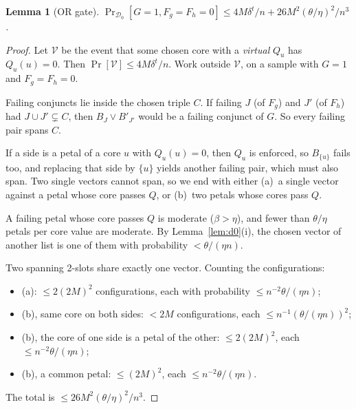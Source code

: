 \documentclass[11pt,a4paper]{article}
\theoremstyle{plain}
\newtheorem{lemma}[theorem]{Lemma}
\theoremstyle{definition}
\theoremstyle{remark}
\newcommand{\Dz}{\mathcal{D}_0}
\begin{document}
\begin{lemma}[OR gate]\label{lem:or}
$\Pr_{\Dz}[G=1,F_g=F_h=0]\le4M\delta^t/n+26M^2(\theta/\eta)^2/n^3$.
\end{lemma}
\begin{proof}
Let $\mathcal V$ be the event that some chosen core with a \emph{virtual} $Q_u$ has $Q_u(u)=0$. Then
$\Pr[\mathcal V]\le4M\delta^t/n$. Work outside $\mathcal V$, on a sample with $G=1$ and $F_g=F_h=0$.

Failing conjuncts lie inside the chosen triple $C$. If failing $J$ (of $F_g$) and $J'$ (of $F_h$) had
$J\cup J'\subsetneq C$, then $B_J\vee B'_{J'}$ would be a failing conjunct of $G$. So every failing pair spans $C$.

If a side is a petal of a core $u$ with $Q_u(u)=0$, then $Q_u$ is enforced, so $B_{\{u\}}$ fails too, and replacing
that side by $\{u\}$ yields another failing pair, which must also span. Two single vectors cannot span, so we end
with either (a)~a single vector against a petal whose core passes $Q$, or (b)~two petals whose cores pass $Q$.

A failing petal whose core passes $Q$ is moderate ($\beta>\eta$), and fewer than $\theta/\eta$ petals per core value
are moderate. By Lemma~\ref{lem:d0}(i), the chosen vector of another list is one of them with probability
$<\theta/(\eta n)$.

Two spanning 2-slots share exactly one vector. Counting the configurations:
\begin{itemize}
  \item (a): $\le2(2M)^2$ configurations, each with probability $\le n^{-2}\theta/(\eta n)$;
  \item (b), same core on both sides: $<2M$ configurations, each $\le n^{-1}(\theta/(\eta n))^2$;
  \item (b), the core of one side is a petal of the other: $\le2(2M)^2$, each $\le n^{-2}\theta/(\eta n)$;
  \item (b), a common petal: $\le(2M)^2$, each $\le n^{-2}\theta/(\eta n)$.
\end{itemize}
The total is $\le26M^2(\theta/\eta)^2/n^3$.
\end{proof}
\end{document}
